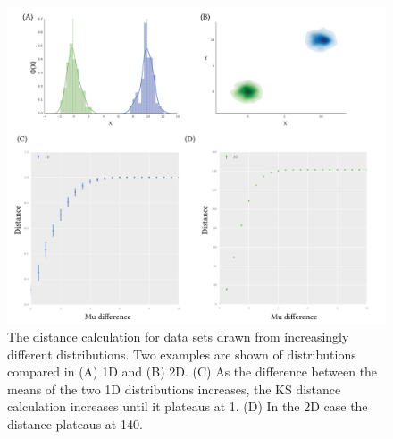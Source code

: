  
\begin{figure}[tb]
\centerfloat
\includegraphics[scale=0.8]{../../chapters/chapterABCFlow/images/mu_diff.png}
\caption[Range of distance values obtained using the Wald-Wolfowitz distance]{\label{fig:epsilon_mud}The distance calculation for data sets drawn from increasingly different distributions. Two examples are shown of distributions compared in (A) 1D and (B) 2D. (C) As the difference between the means of the two 1D distributions increases, the KS distance calculation increases until it plateaus at 1. (D) In the 2D case the distance plateaus at 140.}
\label{fig:normal_example}
\end{figure}


